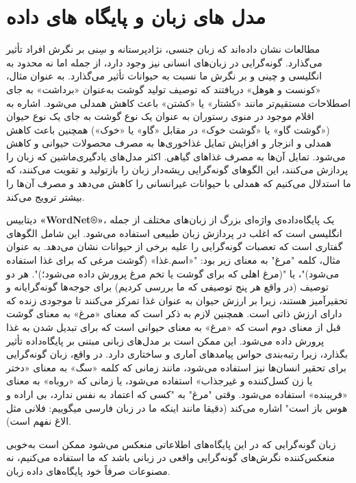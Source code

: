 {
\section*{مدل های زبان و پایگاه های داده}
\label{sec:مدل های زبان و پایگاه های داده}
مطالعات نشان داده‌اند که زبان جنسی، نژادپرستانه و سِنی بر نگرش افراد تأثیر می‌گذارد. گونه‌گرایی در زبان‌های انسانی نیز وجود دارد، از جمله اما نه محدود به انگلیسی و چینی و بر نگرش ما نسبت به حیوانات تأثیر می‌گذارد. به عنوان مثال، «کونست و هوهل» دریافتند که توصیف تولید گوشت به‌عنوان «برداشت» به جای اصطلاحات مستقیم‌تر مانند «کشتار» یا «کشتن» باعث کاهش همدلی می‌شود. اشاره به اقلام موجود در منوی رستوران به عنوان یک نوع گوشت به جای یک نوع حیوان («گوشت گاو» یا «گوشت خوک» در مقابل «گاو» یا «خوک») همچنین باعث کاهش همدلی و انزجار و افزایش تمایل غذاخوری‌ها به مصرف محصولات حیوانی و کاهش می‌شود. تمایل آن‌ها به مصرف غذاهای گیاهی. اکثر مدل‌های یادگیری‌ماشین که زبان را پردازش می‌کنند، این الگوهای گونه‌گرایی ریشه‌دار زبان را بازتولید و تقویت می‌کنند، که ما استدلال می‌کنیم که همدلی با حیوانات غیرانسانی را کاهش می‌دهد و مصرف آن‌ها را بیشتر ترویج می‌کند.
}

دیتابیس \textenglish{\textbf{«WordNet®»}}، یک پایگاه‌داده‌ی واژه‌ای بزرگ از زبان‌های مختلف از جمله انگلیسی است که اغلب در پردازش زبان طبیعی استفاده می‌شود.
این شامل الگوهای گفتاری است که تعصبات گونه‌گرایی را علیه برخی از حیوانات نشان می‌دهد.
به عنوان مثال، کلمه "مرغ" به معنای زیر بود: "«اسم.غذا» (گوشت مرغی که برای غذا استفاده می‌شود)"، یا "(مرغ اهلی که برای گوشت یا تخم مرغ پرورش داده می‌شود؛)".
هر دو توصیف (در واقع هر پنج توصیفی که ما بررسی کردیم) برای جوجه‌ها گونه‌گرایانه و تحقیرآمیز هستند، زیرا بر ارزش حیوان به عنوان غذا تمرکز می‌کنند تا موجودی زنده که دارای ارزش ذاتی است.
همچنین لازم به ذکر است که معنای «مرغ» به معنای گوشت قبل از معنای دوم است که «مرغ» به معنای حیوانی است که برای تبدیل شدن به غذا پرورش داده می‌شود.
این ممکن است بر مدل‌های زبانی مبتنی بر پایگاه‌داده تأثیر بگذارد، زیرا رتبه‌بندی حواس پیامدهای آماری و ساختاری دارد.
در واقع، زبان گونه‌گرایی برای تحقیر انسان‌ها نیز استفاده می‌شود، مانند زمانی که کلمه «سگ» به معنای «دختر یا زن کسل‌کننده و غیرجذاب» استفاده می‌شود، یا زمانی که «روباه» به معنای «فریبنده» استفاده می‌شود.
وقتی "مرغ" به "کسی که اعتماد به نفس ندارد، بی اراده و هوس باز است" اشاره می‌کند (دقیقا مانند اینکه ما در زبان فارسی میگوییم: فلانی مثل الاغ نفهم است).

زبان گونه‌گرایی که در این پایگاه‌های اطلاعاتی منعکس می‌شود ممکن است به‌خوبی منعکس‌کننده نگرش‌های گونه‌گرایی واقعی در زبانی باشد که ما استفاده می‌کنیم، نه مصنوعات صرفاً خود پایگاه‌های داده زبان.

